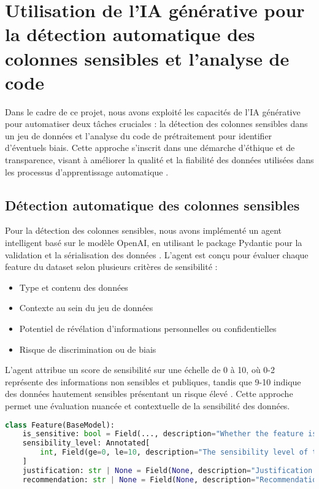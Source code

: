 \section{Utilisation de l'IA générative pour la détection automatique des colonnes sensibles et l'analyse de code}

Dans le cadre de ce projet, nous avons exploité les capacités de l'IA générative pour automatiser deux tâches cruciales : la détection des colonnes sensibles dans un jeu de données et l'analyse du code de prétraitement pour identifier d'éventuels biais. Cette approche s'inscrit dans une démarche d'éthique et de transparence, visant à améliorer la qualité et la fiabilité des données utilisées dans les processus d'apprentissage automatique \cite{ref5}.

\subsection{Détection automatique des colonnes sensibles}

Pour la détection des colonnes sensibles, nous avons implémenté un agent intelligent basé sur le modèle OpenAI, en utilisant le package Pydantic pour la validation et la sérialisation des données \cite{ref1}. L'agent est conçu pour évaluer chaque feature du dataset selon plusieurs critères de sensibilité :

\begin{itemize}
    \item Type et contenu des données
    \item Contexte au sein du jeu de données
    \item Potentiel de révélation d'informations personnelles ou confidentielles
    \item Risque de discrimination ou de biais
\end{itemize}

L'agent attribue un score de sensibilité sur une échelle de 0 à 10, où 0-2 représente des informations non sensibles et publiques, tandis que 9-10 indique des données hautement sensibles présentant un risque élevé \cite{ref2}. Cette approche permet une évaluation nuancée et contextuelle de la sensibilité des données.

\begin{lstlisting}[language=Python,caption=Modèle Feature pour la détection de sensibilité]
class Feature(BaseModel):
    is_sensitive: bool = Field(..., description="Whether the feature is sensitive")
    sensibility_level: Annotated[
        int, Field(ge=0, le=10, description="The sensibility level of the feature")
    ]
    justification: str | None = Field(None, description="Justification if the feature is sensitive")
    recommendation: str | None = Field(None, description="Recommendation for handling the risk if the feature is sensitive")
\end{lstlisting}

